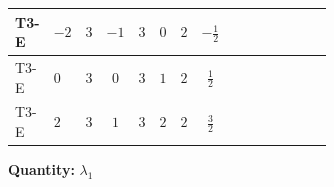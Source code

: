 \documentclass[8pt]{article}
\begin{document}
\begin{landscape}
\begin{longtable}{@{}llcccccc >{\raggedright\arraybackslash}p{0.21\linewidth} >{\raggedright\arraybackslash}p{0.21\linewidth} >{\raggedright\arraybackslash}p{0.21\linewidth}@{}}
\midrule
T3-E & $-2$ & $3$ & $-1$ & $3$ & $0$ & $2$ & $-\frac{1}{2}$ & \scriptsize\adjustbox{max width=\linewidth}{$\begin{gathered} -12 \operatorname{Tr}\!\left({Y_u}\,\left({Y_u}\right)^{\dagger}\,{Y_u}\,\left({Y_u}\right)^{\dagger}\right)\end{gathered}$} & \scriptsize\adjustbox{max width=\linewidth}{$\begin{gathered} +4 {\lambda_5} \left({\lambda_5}\right)^{*}\end{gathered}$} & \scriptsize\adjustbox{max width=\linewidth}{$\begin{gathered} +\frac{9 {g_2}^4}{4}\end{gathered}$} \\
\midrule
T3-E & $0$ & $3$ & $0$ & $3$ & $1$ & $2$ & $\frac{1}{2}$ & \scriptsize\adjustbox{max width=\linewidth}{$\begin{gathered} -12 \operatorname{Tr}\!\left({Y_u}\,\left({Y_u}\right)^{\dagger}\,{Y_u}\,\left({Y_u}\right)^{\dagger}\right)\end{gathered}$} & \scriptsize\adjustbox{max width=\linewidth}{$\begin{gathered} +4 {\lambda_5} \left({\lambda_5}\right)^{*}\end{gathered}$} & \scriptsize\adjustbox{max width=\linewidth}{$\begin{gathered} +\frac{9 {g_2}^4}{4}\end{gathered}$} \\
\midrule
T3-E & $2$ & $3$ & $1$ & $3$ & $2$ & $2$ & $\frac{3}{2}$ & \scriptsize\adjustbox{max width=\linewidth}{$\begin{gathered} -12 \operatorname{Tr}\!\left({Y_u}\,\left({Y_u}\right)^{\dagger}\,{Y_u}\,\left({Y_u}\right)^{\dagger}\right)\end{gathered}$} & \scriptsize\adjustbox{max width=\linewidth}{$\begin{gathered} +4 {\lambda_5} \left({\lambda_5}\right)^{*}\end{gathered}$} & \scriptsize\adjustbox{max width=\linewidth}{$\begin{gathered} +\frac{9 {g_2}^4}{4}\end{gathered}$} \\
\midrule
\bottomrule
\end{longtable}
\clearpage
\noindent\textbf{Quantity: }$\lambda_1$\par\smallskip

\end{landscape}
\end{document}
